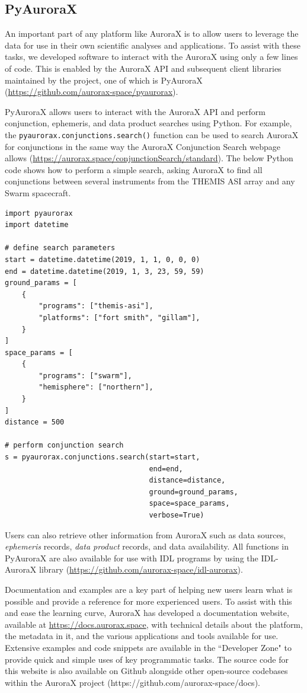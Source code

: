 \documentclass[utf8]{FrontiersinHarvard} %
\begin{document}
\subsection{PyAuroraX}
An important part of any platform like AuroraX is to allow users to leverage the data for use in their own scientific analyses and applications. To assist with these tasks, we developed software to interact with the AuroraX using only a few lines of code. This is enabled by the AuroraX API and subsequent client libraries maintained by the project, one of which is PyAuroraX (\url{https://github.com/aurorax-space/pyaurorax}).

PyAuroraX allows users to interact with the AuroraX API and perform conjunction, ephemeris, and data product searches using Python. For example, the \verb|pyaurorax.conjunctions.search()| function can be used to search AuroraX for conjunctions in the same way the AuroraX Conjunction Search webpage allows (\url{https://aurorax.space/conjunctionSearch/standard}). The below Python code shows how to perform a simple search, asking AuroraX to find all conjunctions between several instruments from the THEMIS ASI array and any Swarm spacecraft.

\begin{verbatim}
import pyaurorax
import datetime

# define search parameters
start = datetime.datetime(2019, 1, 1, 0, 0, 0)
end = datetime.datetime(2019, 1, 3, 23, 59, 59)
ground_params = [
    {
        "programs": ["themis-asi"],
        "platforms": ["fort smith", "gillam"],
    }
]
space_params = [
    {
        "programs": ["swarm"],
        "hemisphere": ["northern"],
    }
]
distance = 500

# perform conjunction search
s = pyaurorax.conjunctions.search(start=start,
                                  end=end,
                                  distance=distance,
                                  ground=ground_params,
                                  space=space_params,
                                  verbose=True)
\end{verbatim}

Users can also retrieve other information from AuroraX such as data sources, \textit{ephemeris} records, \textit{data product} records, and data availability. All functions in PyAuroraX are also available for use with IDL programs by using the IDL-AuroraX library (\url{https://github.com/aurorax-space/idl-aurorax}). 

Documentation and examples are a key part of helping new users learn what is possible and provide a reference for more experienced users. To assist with this and ease the learning curve, AuroraX has developed a documentation website, available at \url{https://docs.aurorax.space}, with technical details about the platform, the metadata in it, and the various applications and tools available for use. Extensive examples and code snippets are available in the ``Developer Zone" to provide quick and simple uses of key programmatic tasks. The source code for this website is also available on Github alongside other open-source codebases within the AuroraX project (https://github.com/aurorax-space/docs). 
\end{document}
